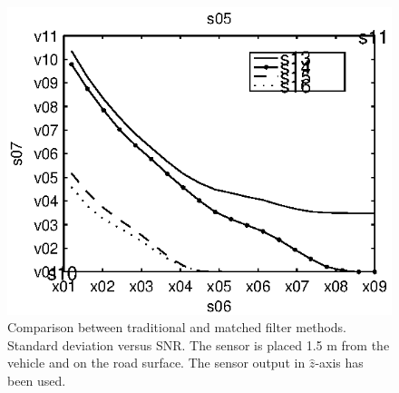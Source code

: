 \begin{subfigures}
\begin{figure}[!tbh]
\begin{minipage}{0.45\linewidth}
   \includegraphics[width=\linewidth]{images/std_error_z}
  \caption[Time difference, method comparison. Error standard deviation.  $\hat{z}$-axis]{Comparison between traditional and matched filter methods. Standard deviation versus SNR. The sensor is placed 1.5 m from the vehicle and on the road surface. The sensor output in $\hat{z}$-axis has been used.}
  \label{fig:comp_std_z}
  \end{minipage}
 \end{figure}
\end{subfigures}

